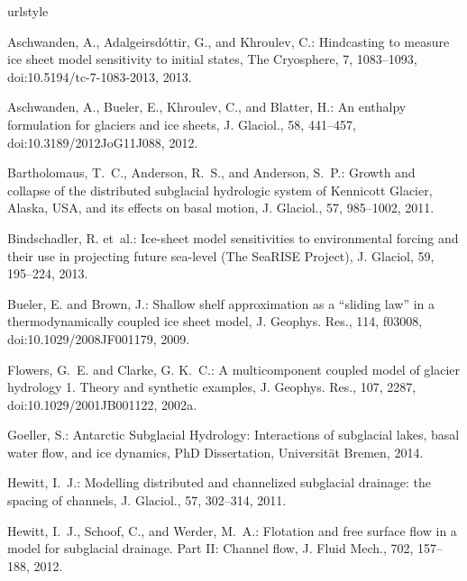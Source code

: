 \documentclass[11pt,reqno]{amsart}
\begin{document}
\begin{thebibliography}{}
\providecommand{\natexlab}[1]{#1}
\providecommand{\url}[1]{{\tt #1}}
\providecommand{\urlprefix}{URL }
\expandafter\ifx\csname urlstyle\endcsname\relax
  \providecommand{\doi}[1]{doi:\discretionary{}{}{}#1}\else
  \providecommand{\doi}{doi:\discretionary{}{}{}\begingroup
  \urlstyle{rm}\Url}\fi

Aschwanden, A., Adalgeirsd{\'o}ttir, G., and Khroulev, C.: Hindcasting to
  measure ice sheet model sensitivity to initial states, The Cryosphere, 7,
  1083--1093, \doi{10.5194/tc-7-1083-2013}, 2013.

Aschwanden, A., Bueler, E., Khroulev, C., and Blatter, H.: An enthalpy
  formulation for glaciers and ice sheets, J. Glaciol., 58, 441--457,
  \doi{10.3189/2012JoG11J088}, 2012.

Bartholomaus, T.~C., Anderson, R.~S., and Anderson, S.~P.: Growth and collapse
  of the distributed subglacial hydrologic system of {K}ennicott {G}lacier,
  {A}laska, {USA}, and its effects on basal motion, J. Glaciol., 57, 985--1002,
  2011.

Bindschadler, R. et~al.: Ice-sheet model sensitivities to environmental forcing
  and their use in projecting future sea-level ({T}he {S}ea{RISE} {P}roject),
  J. Glaciol, 59, 195--224, 2013.

Bueler, E. and Brown, J.: Shallow shelf approximation as a ``sliding law'' in a
  thermodynamically coupled ice sheet model, J. Geophys. Res., 114, f03008,
  doi:10.1029/2008JF001179, 2009.

Flowers, G.~E. and Clarke, G. K.~C.: A multicomponent coupled model of glacier
  hydrology 1. {T}heory and synthetic examples, J. Geophys. Res., 107, 2287,
  \doi{10.1029/2001JB001122}, 2002{\natexlab{a}}.

Goeller, S.: Antarctic {S}ubglacial {H}ydrology: {I}nteractions of subglacial lakes, basal water flow, and ice dynamics, PhD Dissertation, Universit\"at Bremen, 2014.

Hewitt, I.~J.: Modelling distributed and channelized subglacial drainage: the
  spacing of channels, J. Glaciol., 57, 302--314, 2011.

Hewitt, I.~J., Schoof, C., and Werder, M.~A.: Flotation and free surface flow
  in a model for subglacial drainage. {P}art {II}: {C}hannel flow, J. Fluid
  Mech., 702, 157--188, 2012.


\end{thebibliography}
\end{document}
